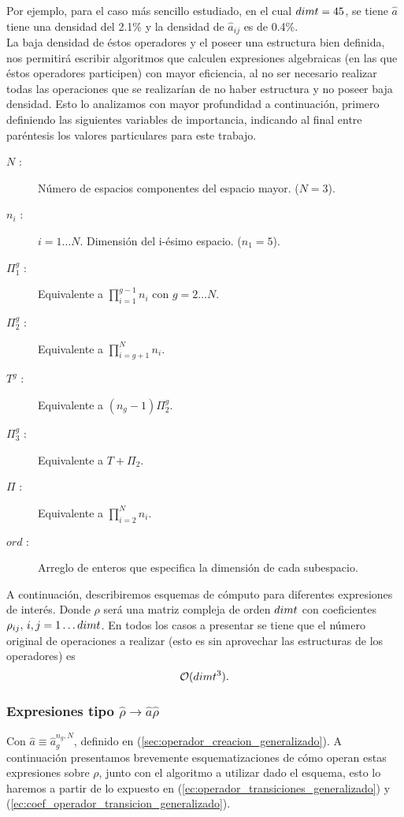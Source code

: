 \quad Por ejemplo, para el caso m\'as sencillo estudiado, en el cual $dimt=45$, se tiene $\hat{a}$ tiene una densidad del 2.1\% y la densidad de $\hat{a}_{ij}$ es de 0.4\%.\\

\quad La baja densidad de \'estos operadores y el poseer una estructura bien definida, nos permitir\'a escribir algoritmos que calculen expresiones algebraicas (en las que \'estos operadores participen) con mayor eficiencia, al no ser necesario realizar todas las operaciones que se realizar\'ian de no haber estructura y no poseer baja densidad. Esto lo analizamos con mayor profundidad a continuaci\'on, primero definiendo las siguientes variables de importancia, indicando al final entre par\'entesis los valores particulares para este trabajo.
\begin{description}

\item [$N$ :] \qquad N\'umero de espacios componentes del espacio mayor. ($N=3$).
\item[$n_i$ :] \qquad $i=1\ldots N$. Dimensi\'on del i-\'esimo espacio. ($n_1=5$).
\item[$\Pi_1^g$ :] \qquad Equivalente a $\prod_{i=1}^{g-1}n_i$ con $g=2\ldots N$.
\item[$\Pi_2^g$ :] \qquad Equivalente a $\prod_{i=g+1}^{N}n_i$.
\item[$T^g$ :] \qquad Equivalente a $(n_g-1)\Pi_2^g$.
\item[$\Pi_3^g$ :] \qquad Equivalente a $T+\Pi_2$.
\item[$\Pi$ :] \qquad  Equivalente a $\prod_{i=2}^N{n_i}$.
\item[$ord$ :] \qquad Arreglo de enteros que especifica la dimensi\'on de cada subespacio.
\end{description}
\quad A continuaci\'on, describiremos esquemas de c\'omputo para diferentes expresiones de inter\'es. Donde $\rho$ ser\'a una matriz compleja de orden $dimt$ con coeficientes $\rho_{ij},\,i,j=1\ldots dimt$. En todos los casos a presentar se tiene que el n\'umero original de operaciones a realizar (esto es sin aprovechar las estructuras de los operadores) es $$\mathcal{O}(dimt^3).$$ 
\subsubsection{Expresiones tipo $\hat{\rho}\rightarrow \hat{a}\hat{\rho}$}\label{sec:arho}
\quad Con $\hat{a}\equiv\hat{a}^{n_g,N}_g$, definido en (\ref{sec:operador_creacion_generalizado}). A continuaci\'on presentamos brevemente esquematizaciones de c\'omo operan estas expresiones sobre $\rho$, junto con el algoritmo a utilizar dado el esquema, esto lo haremos a partir de lo expuesto en (\ref{ec:operador_transiciones_generalizado}) y (\ref{ec:coef_operador_transicion_generalizado}).
